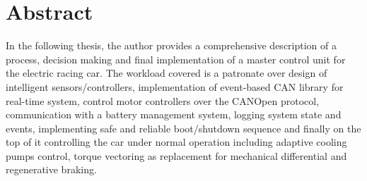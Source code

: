 






\chapter{Abstract}

In the following thesis, the author provides a comprehensive description of a process, decision making and final implementation of a master control unit for the electric racing car. The workload covered is a patronate over design of intelligent sensors/controllers, implementation of event-based CAN library for real-time system, control motor controllers over the CANOpen protocol, communication with a battery management system, logging system state and events, implementing safe and reliable boot/shutdown sequence and finally on the top of it controlling the car under normal operation including adaptive cooling pumps control, torque vectoring as replacement for mechanical differential and regenerative braking.